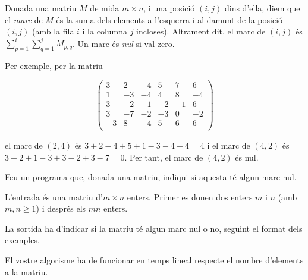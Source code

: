 

\Statement

Donada una matriu $M$ de mida $m\times n$, i una posició $(i,j)$ dins d'ella, diem que el \emph{marc} de $M$ és la suma dels elements a l'esquerra i al damunt de la posició $(i,j)$ (amb la fila $i$ i la columna $j$ incloses). Altrament dit, el marc de $(i,j)$ és $\sum_{p=1}^i\sum_{q=1}^j M_{p,q}$. Un marc és \emph{nul} si val zero.

\medskip

Per exemple, per la matriu

$$
\left(
    \begin{array}{rrrrrr}
         3 & 2 & -4 & 5 & 7 & 6 \\
         1 &-3 & -4 & 4 & 8 & -4 \\
         3 &-2 & -1 &-2 &-1 & 6 \\
         3 &-7 & -2 &-3 & 0 & -2 \\
        -3 & 8 & -4 & 5 & 6 & 6 \\
    \end{array}
\right)
$$

\medskip

el marc de $(2,4)$ és $3+2-4+5+1-3-4+4 = 4$ i el marc de $(4,2)$ és $3+2+1-3+3-2+3-7 = 0$. Per tant, el marc de $(4,2)$ és nul.

\medskip

Feu un programa que, donada una matriu, indiqui si aquesta té algun marc nul.

\Input 

L'entrada és una matriu d'$m\times n$ enters. Primer es donen dos enters $m$ i $n$ (amb $m,n\ge 1$) i després els $mn$ enters.

\Output

La sortida ha d'indicar si la matriu té algun marc nul o no, seguint el format dels exemples.

\Observation 

El vostre algorisme ha de funcionar en temps lineal respecte el nombre d'elements a la matriu. 

\Sample
